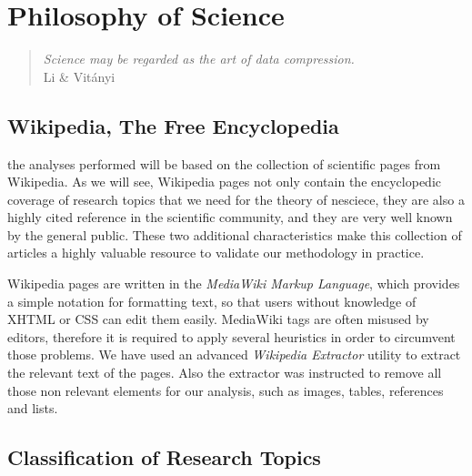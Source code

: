 %
%


\chapter{Philosophy of Science}
\label{chap:philosophy-science}

\begin{quote}
\begin{flushright}
\emph{Science may be regarded as the art of data compression.}\\
Li \& Vitányi
\end{flushright}
\end{quote}
\bigskip

%
%

\section{Wikipedia, The Free Encyclopedia}

the analyses performed will be based on the collection of scientific pages from Wikipedia. As we will see, Wikipedia pages not only contain the encyclopedic coverage of research topics that we need for the theory of nesciece, they are also a highly cited reference in the scientific community, and they are very well known by the general public. These two additional characteristics make this collection of articles a highly valuable resource to validate our methodology in practice.



Wikipedia pages are written in the \emph{MediaWiki Markup Language}, which provides a simple notation for formatting text, so that users without knowledge of XHTML or CSS can edit them easily. MediaWiki tags are often misused by editors, therefore it is required to apply several heuristics in order to circumvent those problems. We have used an advanced \emph{Wikipedia Extractor} utility to extract the relevant text of the pages. Also the extractor was instructed to remove all those non relevant elements for our analysis, such as images, tables, references and lists. 

%
%

\section{Classification of Research Topics}
\label{sec:Classification_Research_Topics}

